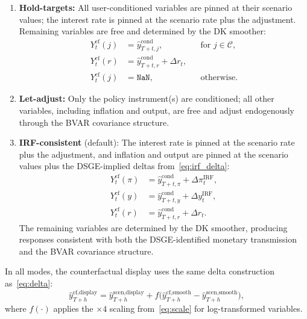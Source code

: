 \documentclass[11pt]{article}
\theoremstyle{definition}
\theoremstyle{remark}
\begin{document}
\begin{enumerate}[label=\textbf{(\alph*)}]
  \item \textbf{Hold-targets:} All user-conditioned variables are
    pinned at their scenario values; the interest rate is pinned at
    the scenario rate plus the adjustment.  Remaining variables are
    free and determined by the DK smoother:
    \begin{align}
      Y_t^{\text{cf}}(j) &= \hat{y}_{T+t,j}^{\text{cond}},
        & &\text{for } j \in \mathcal{C}, \\
      Y_t^{\text{cf}}(r) &= \hat{y}_{T+t,r}^{\text{cond}}
        + \Delta r_t, \\
      Y_t^{\text{cf}}(j) &= \texttt{NaN},
        & &\text{otherwise}.
    \end{align}

  \item \textbf{Let-adjust:} Only the policy instrument(s) are
    conditioned; all other variables, including inflation and output,
    are free and adjust endogenously through the BVAR covariance
    structure.

  \item \textbf{IRF-consistent} (default):  The interest rate is
    pinned at the scenario rate plus the adjustment, and inflation
    and output are pinned at the scenario values plus the
    DSGE-implied deltas from~\eqref{eq:irf_delta}:
    \begin{align}\label{eq:irf_consist}
      Y_t^{\text{cf}}(\pi) &= \hat{y}_{T+t,\pi}^{\text{cond}}
        + \Delta \pi_t^{\text{IRF}}, \\
      Y_t^{\text{cf}}(y) &= \hat{y}_{T+t,y}^{\text{cond}}
        + \Delta y_t^{\text{IRF}}, \\
      Y_t^{\text{cf}}(r) &= \hat{y}_{T+t,r}^{\text{cond}}
        + \Delta r_t.
    \end{align}
    The remaining variables are determined by the DK smoother,
    producing responses consistent with both the DSGE-identified
    monetary transmission and the BVAR covariance structure.
\end{enumerate}

In all modes, the counterfactual display uses the same delta
construction as~\eqref{eq:delta}:
\begin{equation}\label{eq:cf_display}
  \hat{y}_{T+h}^{\text{cf,display}} =
  \hat{y}_{T+h}^{\text{scen,display}}
  + f\!\bigl(\hat{y}_{T+h}^{\text{cf,smooth}}
  - \hat{y}_{T+h}^{\text{scen,smooth}}\bigr),
\end{equation}
where $f(\cdot)$ applies the $\times 4$ scaling from~\eqref{eq:scale}
for log-transformed variables.
\end{document}
